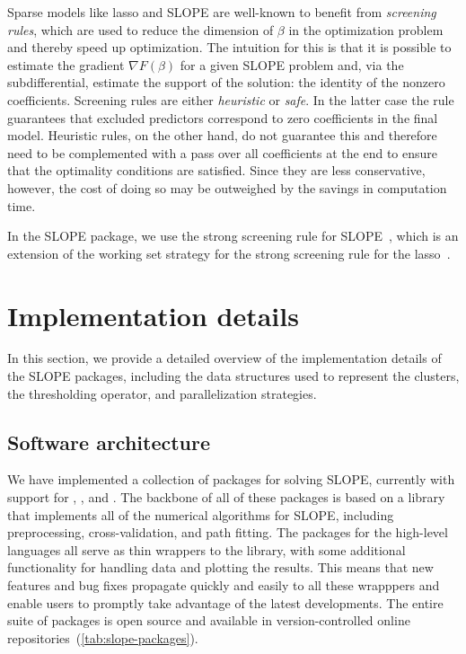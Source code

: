 \documentclass[article]{jss}
\begin{document}
Sparse models like lasso and SLOPE are well-known to benefit from
\emph{screening rules}, which are used to reduce the dimension of \(\beta\) in
the optimization problem and thereby speed up optimization. The intuition for
this is that it is possible to estimate the gradient \(\nabla F(\beta) \) for a
given SLOPE problem and, via the subdifferential, estimate the support of the
solution: the identity of the nonzero coefficients. Screening rules are
either \emph{heuristic} or \emph{safe}. In the latter case the rule guarantees that
excluded predictors correspond to zero coefficients in the final model. Heuristic
rules, on the other hand, do not guarantee this and therefore need to be
complemented with a pass over all coefficients at the end to ensure that the
optimality conditions are satisfied. Since they are less conservative, however,
the cost of doing so may be outweighed by the savings in computation
time.

In the SLOPE package, we use the strong screening rule for
SLOPE~\citep{larsson2020a}, which is an extension of the working set strategy
for the strong screening rule for the lasso~\citep{tibshirani2012}.

\section{Implementation details}
\label{sec:implementation-details}

In this section, we provide a detailed overview of the implementation
details of the SLOPE packages, including the data structures used to represent
the clusters, the thresholding operator, and parallelization strategies.

\subsection{Software architecture}

We have implemented a collection of packages for solving SLOPE, currently with
support for , , and . The backbone
of all of these packages is based on a  library that implements
all of the numerical algorithms for SLOPE, including preprocessing,
cross-validation, and path fitting. The packages for the high-level languages
all serve as thin wrappers to the  library, with some additional
functionality for handling data and plotting the results. This means that new
features and bug fixes propagate quickly and easily to all these wrapppers and
enable users to promptly take advantage of the latest developments. The entire
suite of packages is open source and available in version-controlled
online repositories~(\autoref{tab:slope-packages}).
\end{document}
